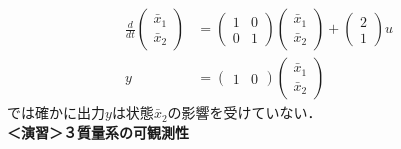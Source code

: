\begin{align}
 \frac{d}{dt}
  \left(
   \begin{array}{c}
    \bar{x}_1 \\
    \bar{x}_2
   \end{array}
  \right) &= 
  \left(
   \begin{array}{cc}
    1 & 0 \\
    0 & 1
   \end{array}
  \right)
  \left(
   \begin{array}{c}
    \bar{x}_1 \\
    \bar{x}_2
   \end{array}
  \right) +
  \left(
   \begin{array}{c}
    2 \\
    1
   \end{array}
  \right) u \\
 y &=
  \left(
   \begin{array}{cc}
    1 & 0
   \end{array}
  \right) 
  \left(
   \begin{array}{c}
    \bar{x}_1 \\
    \bar{x}_2
   \end{array}
  \right)
\end{align}
では確かに出力$y$は状態$\bar{x}_2$の影響を受けていない．
\\

\noindent
{\bf ＜演習＞３質量系の可観測性}

